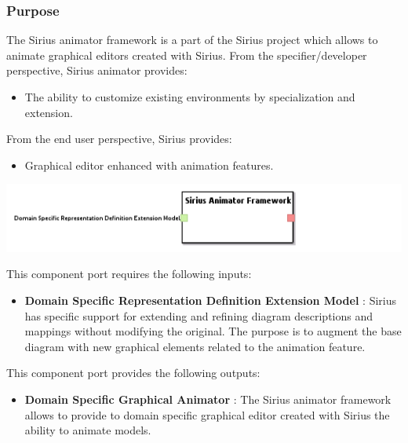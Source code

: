 \documentclass{gemoc} %
\begin{document}
\subsubsection{Purpose}
The Sirius animator framework is a part of the Sirius project which allows to animate graphical editors created with Sirius.
From the specifier/developer perspective, Sirius animator provides:
\begin{itemize}
\item The ability to customize existing environments by specialization and extension.
\end{itemize}
From the end user perspective, Sirius provides:
\begin{itemize}
\item Graphical editor enhanced with animation features.
\end{itemize}
\begin{center}
\includegraphics*[trim=0.0cm 0.0cm 0cm 0.0cm, clip=true]{../images/generated/Generated_Sirius_Animator_Framework.png}
\end{center}

This component port requires the following inputs:
\begin{itemize}
  \item \textbf{Domain Specific Representation Definition Extension Model} :
Sirius has specific support for extending and refining diagram descriptions and mappings without modifying the original. The purpose is to augment the base diagram with new graphical elements related to the animation feature.
\end{itemize}

This component port provides the following outputs:
\begin{itemize}
  \item \textbf{Domain Specific Graphical Animator} :
The Sirius animator framework allows to provide to domain specific graphical editor created with Sirius the ability to animate models.
\end{itemize}
\end{document}
